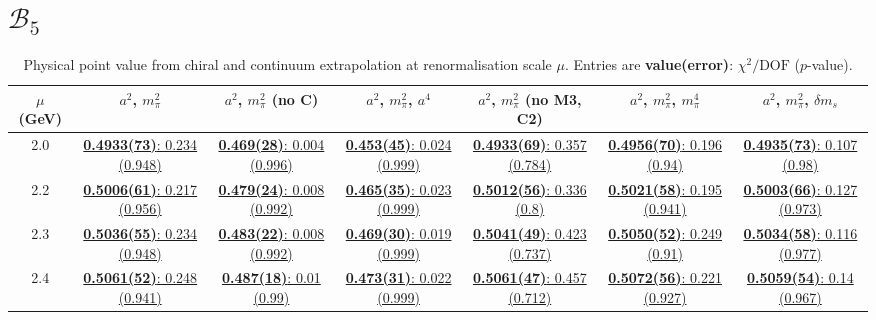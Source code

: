 \documentclass[12pt]{extarticle}
\begin{document}
\section{$\mathcal{B}_5$}
\begin{table}[h!]
\begin{center}
\begin{tabular}{|c|c|c|c|c|c|c|}
\hline
$\mu$ (GeV) & $a^2$, $m_\pi^2$& $a^2$, $m_\pi^2$ (no C)& $a^2$, $m_\pi^2$, $a^4$& $a^2$, $m_\pi^2$ (no M3, C2)& $a^2$, $m_\pi^2$, $m_\pi^4$& $a^2$, $m_\pi^2$, $\delta m_s$\\
\hline
2.0& \hyperlink{TT/SUSY/bag_a2m2_20.pdf.1}{\textbf{0.4933(73)}: 0.234 (0.948)} & \hyperlink{TT/SUSY/bag_a2m2noC_20.pdf.1}{\textbf{0.469(28)}: 0.004 (0.996)} & \hyperlink{TT/SUSY/bag_a2a4m2_20.pdf.1}{\textbf{0.453(45)}: 0.024 (0.999)} & \hyperlink{TT/SUSY/bag_a2m2mcut_20.pdf.1}{\textbf{0.4933(69)}: 0.357 (0.784)} & \hyperlink{TT/SUSY/bag_a2m2m4_20.pdf.1}{\textbf{0.4956(70)}: 0.196 (0.94)} & \hyperlink{TT/SUSY/bag_a2m2delm_20.pdf.1}{\textbf{0.4935(73)}: 0.107 (0.98)}\\
2.2& \hyperlink{TT/SUSY/bag_a2m2_22.pdf.1}{\textbf{0.5006(61)}: 0.217 (0.956)} & \hyperlink{TT/SUSY/bag_a2m2noC_22.pdf.1}{\textbf{0.479(24)}: 0.008 (0.992)} & \hyperlink{TT/SUSY/bag_a2a4m2_22.pdf.1}{\textbf{0.465(35)}: 0.023 (0.999)} & \hyperlink{TT/SUSY/bag_a2m2mcut_22.pdf.1}{\textbf{0.5012(56)}: 0.336 (0.8)} & \hyperlink{TT/SUSY/bag_a2m2m4_22.pdf.1}{\textbf{0.5021(58)}: 0.195 (0.941)} & \hyperlink{TT/SUSY/bag_a2m2delm_22.pdf.1}{\textbf{0.5003(66)}: 0.127 (0.973)}\\
2.3& \hyperlink{TT/SUSY/bag_a2m2_23.pdf.1}{\textbf{0.5036(55)}: 0.234 (0.948)} & \hyperlink{TT/SUSY/bag_a2m2noC_23.pdf.1}{\textbf{0.483(22)}: 0.008 (0.992)} & \hyperlink{TT/SUSY/bag_a2a4m2_23.pdf.1}{\textbf{0.469(30)}: 0.019 (0.999)} & \hyperlink{TT/SUSY/bag_a2m2mcut_23.pdf.1}{\textbf{0.5041(49)}: 0.423 (0.737)} & \hyperlink{TT/SUSY/bag_a2m2m4_23.pdf.1}{\textbf{0.5050(52)}: 0.249 (0.91)} & \hyperlink{TT/SUSY/bag_a2m2delm_23.pdf.1}{\textbf{0.5034(58)}: 0.116 (0.977)}\\
2.4& \hyperlink{TT/SUSY/bag_a2m2_24.pdf.1}{\textbf{0.5061(52)}: 0.248 (0.941)} & \hyperlink{TT/SUSY/bag_a2m2noC_24.pdf.1}{\textbf{0.487(18)}: 0.01 (0.99)} & \hyperlink{TT/SUSY/bag_a2a4m2_24.pdf.1}{\textbf{0.473(31)}: 0.022 (0.999)} & \hyperlink{TT/SUSY/bag_a2m2mcut_24.pdf.1}{\textbf{0.5061(47)}: 0.457 (0.712)} & \hyperlink{TT/SUSY/bag_a2m2m4_24.pdf.1}{\textbf{0.5072(56)}: 0.221 (0.927)} & \hyperlink{TT/SUSY/bag_a2m2delm_24.pdf.1}{\textbf{0.5059(54)}: 0.14 (0.967)}\\
\hline
\end{tabular}
\caption{Physical point value from chiral and continuum extrapolation at renormalisation scale $\mu$. Entries are \textbf{value(error)}: $\chi^2/\text{DOF}$ ($p$-value).}
\end{center}
\end{table}
\end{document}

